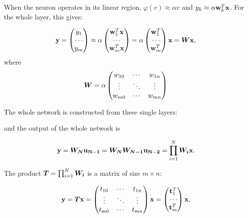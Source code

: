 \begin{enumerate}
\begin{solution}
    When the neuron operates in its linear region, $\varphi(v) \approx
    \alpha v$ and $y_k \approx \alpha {\bf{w}}_k^T {\bf{x}}$. For the
    whole layer, this gives: 

    \begin{equation}
      {\bf{y}} = \begin{pmatrix}  y_1 \\ \cdots \\ y_m \end{pmatrix}
      \approx \alpha \begin{pmatrix}  {\bf{w}}_1^T {\bf{x}}\\ \cdots \\
        {\bf{w}}_m^T {\bf{x}} \end{pmatrix} 
      = \alpha \begin{pmatrix}  {\bf{w}}_1^T\\ \cdots \\
        {\bf{w}}_m^T \end{pmatrix} {\bf{x}} = \boldsymbol{W} {\bf{x}},
    \end{equation}
    where
    \begin{equation}
      \boldsymbol{W} = \alpha \begin{pmatrix}
        w_{10} & \cdots & w_{1n} \\ \vdots & \ddots & \vdots \\
        w_{m0} & \cdots & w_{mn} 
      \end{pmatrix}
    \end{equation}
    
    The whole network is constructed from these single layers:

    \begin{center}
      
    \end{center}
    
    and the output of the whole network is

    \begin{equation}
      {\bf{y}} = \boldsymbol{W_N} {\bf{u_{N-1}}} = \boldsymbol{W_N}  \boldsymbol{W_{N-1}}
      {\bf{u_{N-2}}} = \prod_{i = 1}^{N} \boldsymbol{W_i} {\bf{x}}.
    \end{equation}

    The product $\boldsymbol{T} = \prod_{i = 1}^{N} \boldsymbol{W_i}$ is a matrix of
    size $m \times n$: 

    \begin{equation}
      {\bf{y}} = \boldsymbol{T} {\bf{x}} = 
      \begin{pmatrix}
        t_{10} & \cdots & t_{1n} \\ \vdots & \ddots & \vdots \\
        t_{m0} & \cdots & t_{mn} 
      \end{pmatrix} {\bf{x}} = 
      \begin{pmatrix}  {\bf{t}}_1^T\\ \cdots \\
        {\bf{t}}_m^T 
      \end{pmatrix} {\bf{x}},
    \end{equation}
    

\end{solution}
\end{enumerate}
